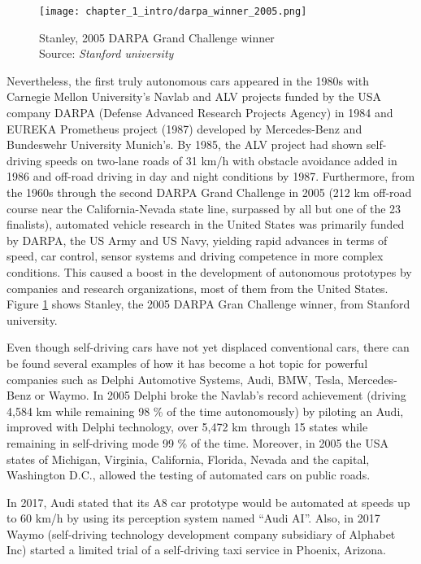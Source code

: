 \begin{figure}[h]
	\centering
	\texttt{[image: chapter\_1\_intro/darpa\_winner\_2005.png]}
	\caption[Stanley, 2005 DARPA Grand Challenge winner]{Stanley, 2005 DARPA Grand Challenge winner \\ Source: \textit{Stanford university}}
	\label{fig:chapter_1_intro/darpa_winner_2005}
\end{figure}

Nevertheless, the first truly autonomous cars appeared in the 1980s with Carnegie Mellon University’s Navlab and ALV projects funded by the USA company DARPA (Defense Advanced Research Projects Agency) in 1984 and EUREKA Prometheus project (1987) developed by Mercedes-Benz and Bundeswehr University Munich’s. By 1985, the ALV project had shown self-driving speeds on two-lane roads of 31 km/h with obstacle avoidance added in 1986 and off-road driving in day and night conditions by 1987. Furthermore, from the 1960s through the second DARPA Grand Challenge in 2005 (212 km off-road course near the California-Nevada state line, surpassed by all but one of the 23 finalists), automated vehicle research in the United States was primarily funded by DARPA, the US Army and US Navy, yielding rapid advances in terms of speed, car control, sensor systems and driving competence in more complex conditions. This caused a boost in the development of autonomous prototypes by companies and research organizations, most of them from the United States. Figure \ref{fig:chapter_1_intro/darpa_winner_2005} shows Stanley, the 2005 DARPA Gran Challenge winner, from Stanford university. 

Even though self-driving cars have not yet displaced conventional cars, there can be found several examples of how it has become a hot topic for powerful companies such as Delphi Automotive Systems, Audi, BMW, Tesla, Mercedes-Benz or Waymo. In 2005 Delphi broke the Navlab’s record achievement (driving 4,584 km while remaining 98 \% of the time autonomously) by piloting an Audi, improved with Delphi technology, over 5,472 km through 15 states while remaining in self-driving mode 99 \% of the time. Moreover, in 2005 the USA states of Michigan, Virginia, California, Florida, Nevada and the capital, Washington D.C., allowed the testing of automated cars on public roads. 

In 2017, Audi stated that its A8 car prototype would be automated at speeds up to 60 km/h by using its perception system named “Audi AI”.  Also, in 2017 Waymo (self-driving technology development company subsidiary of Alphabet Inc) started a limited trial of a self-driving taxi service in Phoenix, Arizona. 

